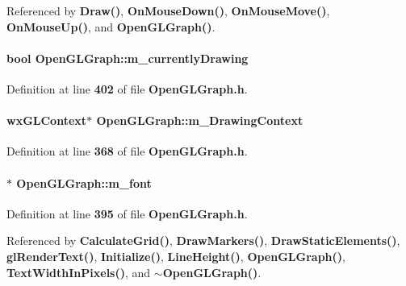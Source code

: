 Referenced by {\bf Draw()}, {\bf On\+Mouse\+Down()}, {\bf On\+Mouse\+Move()}, {\bf On\+Mouse\+Up()}, and {\bf Open\+G\+L\+Graph()}.

\paragraph[{m\+\_\+currently\+Drawing}]{\setlength{\rightskip}{0pt plus 5cm}bool Open\+G\+L\+Graph\+::m\+\_\+currently\+Drawing\hspace{0.3cm}{\ttfamily [private]}}\label{classOpenGLGraph_a22ee4dbdba03de18c95d972d899734ef}


Definition at line {\bf 402} of file {\bf Open\+G\+L\+Graph.\+h}.

\paragraph[{m\+\_\+\+Drawing\+Context}]{\setlength{\rightskip}{0pt plus 5cm}wx\+G\+L\+Context$\ast$ Open\+G\+L\+Graph\+::m\+\_\+\+Drawing\+Context\hspace{0.3cm}{\ttfamily [private]}}\label{classOpenGLGraph_ad4f019eab16268688d5d042aad5acc74}


Definition at line {\bf 368} of file {\bf Open\+G\+L\+Graph.\+h}.

\paragraph[{m\+\_\+font}]{$\ast$ Open\+G\+L\+Graph\+::m\+\_\+font\hspace{0.3cm}{\ttfamily [private]}}\label{classOpenGLGraph_a11f9233d2c8baf42aa15c27468743adb}


Definition at line {\bf 395} of file {\bf Open\+G\+L\+Graph.\+h}.



Referenced by {\bf Calculate\+Grid()}, {\bf Draw\+Markers()}, {\bf Draw\+Static\+Elements()}, {\bf gl\+Render\+Text()}, {\bf Initialize()}, {\bf Line\+Height()}, {\bf Open\+G\+L\+Graph()}, {\bf Text\+Width\+In\+Pixels()}, and {\bf $\sim$\+Open\+G\+L\+Graph()}.

